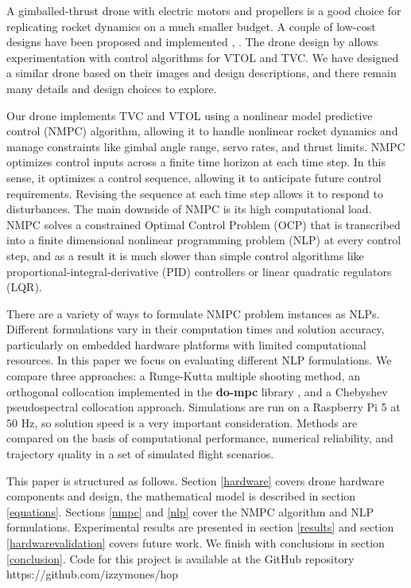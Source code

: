 \documentclass[conf]{new-aiaa}
\begin{document}
	A gimballed-thrust drone with electric motors and propellers is a good choice for replicating rocket dynamics on a much smaller budget. A couple of low-cost designs have been proposed and implemented  \citep{cheapTVC}, \citep{TVCDrone}. The drone design by \cite{TVCDrone} allows experimentation with control algorithms for VTOL and TVC. We have designed a similar drone based on their images and design descriptions, and there remain many details and design choices to explore.



	Our drone implements TVC and VTOL using a nonlinear model predictive control (NMPC) algorithm, allowing it to handle nonlinear rocket dynamics and manage constraints like gimbal angle range, servo rates, and thrust limits. NMPC optimizes control inputs across a finite time horizon at each time step. In this sense, it optimizes a control sequence, allowing it to anticipate future control requirements. Revising the sequence at each time step allows it to respond to disturbances. The main downside of NMPC is its high computational load. NMPC solves a constrained Optimal Control Problem (OCP) that is transcribed into a finite dimensional nonlinear programming problem (NLP) at every control step, and as a result it is much slower than simple control algorithms like proportional-integral-derivative (PID) controllers or linear quadratic regulators (LQR).



	There are a variety of ways to formulate NMPC problem instances as NLPs. Different formulations  vary in their computation times and solution accuracy, particularly on embedded hardware platforms with limited computational resources.
	In this paper we focus on evaluating different NLP formulations. We  compare three approaches: a Runge-Kutta multiple shooting method, an orthogonal collocation  implemented in the {\bf do-mpc}  library \citep{do-mpc},  and a Chebyshev pseudospectral collocation approach. 
	Simulations are run on a Raspberry Pi 5 at $50$ Hz, so solution speed is a very important consideration.
	Methods are compared on the basis of computational performance, numerical reliability, and trajectory quality in a set of simulated flight scenarios.  


	This paper is structured as follows.  Section \ref{hardware} covers drone hardware components and design, the mathematical model is described in section \ref{equations}. Sections \ref{nmpc} and \ref{nlp} cover the NMPC algorithm and NLP formulations. Experimental results are presented in section \ref{results} and section \ref{hardwarevalidation} covers future work. We finish with conclusions in section \ref{conclusion}.
	Code for this project is available at the GitHub repository https://github.com/izzymones/hop
	
\end{document}
